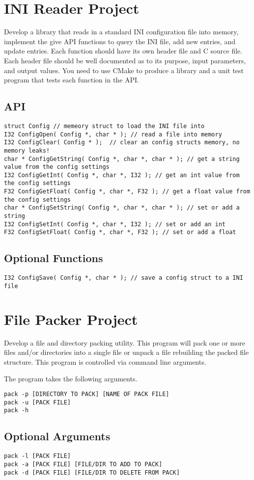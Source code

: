 \documentclass[a4paper,12pt]{report}
\begin{document}
\pagebreak
\section*{INI Reader Project}
Develop a library that reads in a standard INI configuration file into memory, implement the give API functions to query the INI file, add new entries, and update entries.  Each function should have its own header file and C source file.  Each header file should be well documented as to its purpose, input parameters, and output values.  You need to use CMake to produce a library and a unit test program that tests each function in the API.

\subsection*{API}
\begin{lstlisting}
struct Config // memeory struct to load the INI file into
I32 ConfigOpen( Config *, char * ); // read a file into memory
I32 ConfigClear( Config * );  // clear an config structs memory, no memory leaks!
char * ConfigGetString( Config *, char *, char * ); // get a string value from the config settings
I32 ConfigGetInt( Config *, char *, I32 ); // get an int value from the config settings
F32 ConfigGetFloat( Config *, char *, F32 ); // get a float value from the config settings
char * ConfigSetString( Config *, char *, char * ); // set or add a string
I32 ConfigSetInt( Config *, char *, I32 ); // set or add an int
F32 ConfigSetFloat( Config *, char *, F32 ); // set or add a float
\end{lstlisting}

\subsection*{Optional Functions}
\begin{lstlisting}
I32 ConfigSave( Config *, char * ); // save a config struct to a INI file
\end{lstlisting}

\pagebreak
\section*{File Packer Project}
Develop a file and directory packing utility.  This program will pack one or more files and/or directories into a single file or unpack a file rebuilding the packed file structure.  This program is controlled via command line arguments.

The program takes the following arguments.
\begin{lstlisting}
pack -p [DIRECTORY TO PACK] [NAME OF PACK FILE]
pack -u [PACK FILE]
pack -h
\end{lstlisting}

\subsection*{Optional Arguments}
\begin{lstlisting}
pack -l [PACK FILE]
pack -a [PACK FILE] [FILE/DIR TO ADD TO PACK]
pack -d [PACK FILE] [FILE/DIR TO DELETE FROM PACK]
\end{lstlisting}
\end{document}
